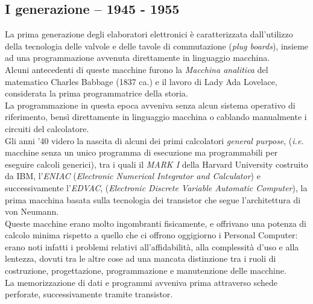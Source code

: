 \documentclass[12pt, letterpaper]{article}
\begin{document}
\subsection{I generazione -- 1945 - 1955}
La prima generazione degli elaboratori elettronici è caratterizzata dall'utilizzo della tecnologia delle valvole e delle tavole di commutazione (\textit{plug boards}), insieme ad una programmazione avvenuta direttamente in linguaggio macchina.\\
Alcuni antecedenti di queste macchine furono la \textit{Macchina analitica} del matematico Charles Babbage (1837 ca.) e il lavoro di Lady Ada Lovelace, considerata la prima programmatrice della storia.\\
La programmazione in questa epoca avveniva senza alcun sistema operativo di riferimento, bensì direttamente in linguaggio macchina o cablando manualmente i circuiti del calcolatore.\\
Gli anni '40 videro la nascita di alcuni dei primi calcolatori \textit{general purpose}, (\textit{i.e.} macchine senza un unico programma di esecuzione ma programmabili per eseguire calcoli generici), tra i quali il \textit{MARK I} della Harvard University costruito da IBM, l'\textit{ENIAC} (\textit{Electronic Numerical Integrator and Calculator}) e successivamente l'\textit{EDVAC}, (\textit{Electronic Discrete Variable Automatic Computer}), la prima macchina basata sulla tecnologia dei transistor che segue l'architettura di von Neumann.\\
Queste macchine erano molto ingombranti fisicamente, e offrivano una potenza di calcolo minima rispetto a quello che ci offrono oggigiorno i Personal Computer: erano noti infatti i problemi relativi all'affidabilità, alla complessità d'uso e alla lentezza, dovuti tra le altre cose ad una mancata distinzione tra i ruoli di costruzione, progettazione, programmazione e manutenzione delle macchine. \\
La memorizzazione di dati e programmi avveniva prima attraverso schede perforate, successivamente tramite transistor.
\end{document}
